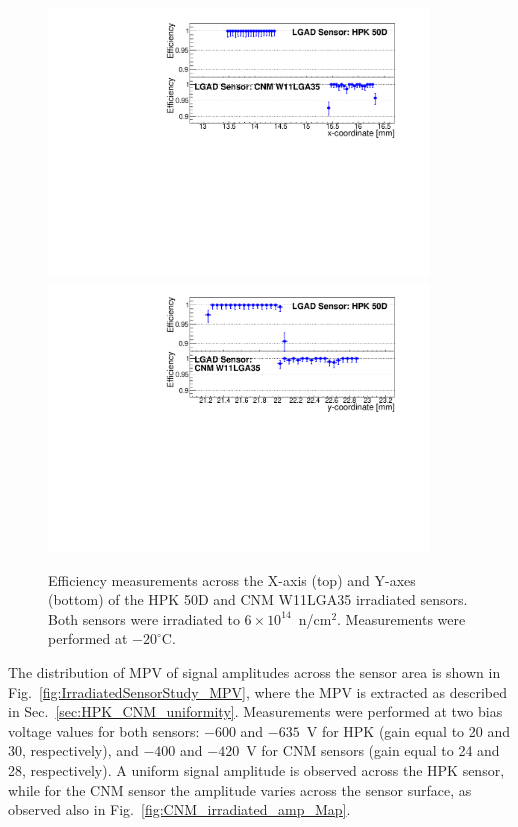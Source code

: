 \documentclass[preprint,1p]{elsarticle}
\begin{document}
\begin{figure}[htbp] 
\centering
\includegraphics[width=0.90\textwidth]{figs/USCSBoard_HPK50DIrradiated-CNMW11LGA35_Run936-961/IrradiatedSensorStudy_Efficiency_vs_X.pdf} 
\includegraphics[width=0.90\textwidth]{figs/USCSBoard_HPK50DIrradiated-CNMW11LGA35_Run936-961/IrradiatedSensorStudy_Efficiency_vs_Y.pdf} 
\caption{Efficiency measurements across the X-axis (top) and Y-axes (bottom) of the HPK 50D and CNM W11LGA35 irradiated sensors. Both sensors were irradiated to $6\times 10^{14}$~n/cm$^2$. Measurements were performed at $-20^{\circ}$C.} 
\label{fig:IrradiatedSensorStudy_Efficiency} 
\end{figure} 

The distribution of MPV of signal amplitudes across the sensor area is shown in
Fig.~\ref{fig:IrradiatedSensorStudy_MPV}, where the MPV is extracted as
described in Sec.~\ref{sec:HPK_CNM_uniformity}. Measurements were performed at
two bias voltage values for both sensors: $-600$ and $-635$~V for HPK (gain
equal to 20 and 30, respectively), and $-400$ and $-420$~V for CNM sensors (gain
equal to 24 and 28, respectively). A uniform signal amplitude is observed across
the HPK sensor, while for the CNM sensor the amplitude varies across the sensor
surface, as observed also in Fig.~\ref{fig:CNM_irradiated_amp_Map}. 
\end{document}
